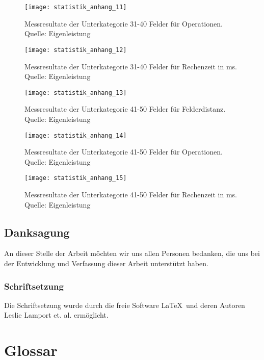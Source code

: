 \begin{figure}[H]
  \centering
  \texttt{[image: statistik\_anhang\_11]}
  \caption[Messresultate der Unterkategorie 31-40 Felder für Operationen.]{Messresultate der Unterkategorie 31-40 Felder für Operationen. Quelle: Eigenleistung}
\end{figure}
\begin{figure}[H]
  \centering
  \texttt{[image: statistik\_anhang\_12]}
  \caption[Messresultate der Unterkategorie 31-40 Felder für Rechenzeit in ms.]{Messresultate der Unterkategorie 31-40 Felder für Rechenzeit in ms. Quelle: Eigenleistung}
\end{figure}
\begin{figure}[H]
  \centering
  \texttt{[image: statistik\_anhang\_13]}
  \caption[Messresultate der Unterkategorie 41-50 Felder für Felderdistanz.]{Messresultate der Unterkategorie 41-50 Felder für Felderdistanz. Quelle: Eigenleistung}
\end{figure}
\begin{figure}[H]
  \centering
  \texttt{[image: statistik\_anhang\_14]}
  \caption[Messresultate der Unterkategorie 41-50 Felder für Operationen.]{Messresultate der Unterkategorie 41-50 Felder für Operationen. Quelle: Eigenleistung}
\end{figure}
\begin{figure}[H]
  \centering
  \texttt{[image: statistik\_anhang\_15]}
  \caption[Messresultate der Unterkategorie 41-50 Felder für Rechenzeit in ms.]{Messresultate der Unterkategorie 41-50 Felder für Rechenzeit in ms. Quelle: Eigenleistung}
\end{figure}

\section{Danksagung}
An dieser Stelle der Arbeit möchten wir uns allen Personen bedanken, die uns bei der Entwicklung und Verfassung dieser Arbeit unterstützt haben.

\subsection{Schriftsetzung}
Die Schriftsetzung wurde durch die freie Software \LaTeX\  und deren Autoren Leslie Lamport et. al. ermöglicht.

\chapter{Glossar}
